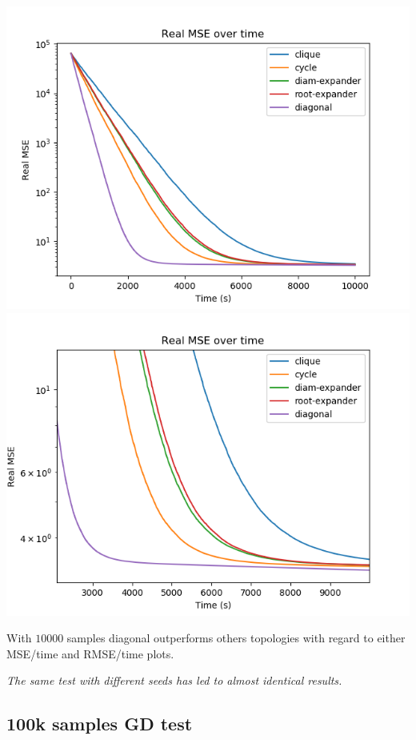 \documentclass[11pt]{article}
\makeatletter
\def\maxwidth{\ifdim\Gin@nat@width>\linewidth\linewidth
    \else\Gin@nat@width\fi}
\let\Oldincludegraphics\includegraphics
\renewcommand{\includegraphics}[1]{\Oldincludegraphics[width=.8\maxwidth]{#1}}
\makeatother
\begin{document}
\includegraphics{media/img/tests/test_003_10ksamples_classic/3_real-mse_time.png}
\includegraphics{media/img/tests/test_003_10ksamples_classic/3_real-mse_time_zoom.png}

With \(10000\) samples diagonal outperforms others topologies with
regard to either MSE/time and RMSE/time plots.

\emph{The same test with different seeds has led to almost identical
results.}

    \subsection{100k samples GD test}\label{k-samples-gd-test}
\end{document}

